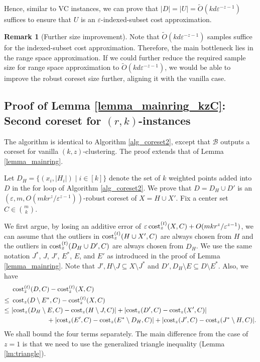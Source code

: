 \documentclass[11pt,letterpaper]{article}
\theoremstyle{definition}
\newtheorem{remark}[theorem]{Remark}
\newcommand{\eps}{\varepsilon}
\DeclarePairedDelimiter{\abs}{\lvert}{\rvert}
\begin{document}
Hence, similar to VC instances, we can prove that $|D| = |U| = \tilde{O}( k d \eps^{-z-1})$ suffices to ensure that $U$ is an $\eps$-indexed-subset cost approximation.
%

\begin{remark}[Further size improvement]
\label{remark:open}
Note that \( \tilde{O}( k d \eps^{-z-1}) \) samples suffice for the indexed-subset cost approximation.  
%
Therefore, the main bottleneck lies in the range space approximation.  
%
If we could further reduce the required sample size for range space approximation to \( \tilde{O}( k d \eps^{-z-1}) \), we would be able to improve the robust coreset size further, aligning it with the vanilla case.
\end{remark}

\subsection{Proof of Lemma \ref{lemma_mainring_kzC}: Second coreset for $(r,k)$-instances}
\label{sec:proof_2}

The algorithm is identical to Algorithm \ref{alg_coreset2}, except that \(\mathcal{B}\) outputs a coreset for vanilla \((k,z)\)-clustering.  
%
The proof extends that of Lemma \ref{lemma_mainring}.  
%


Let $D_H=\{(x_i,|H_i|)\mid i\in [k]\}$ denote the set of $k$ weighted points added into $D$ in the for loop of Algorithm \ref{alg_coreset2}. 
%
We prove that $D=D_H\cup D'$ is an $(\eps,m,O(mkr^z/\eps^{z-1}))$-robust coreset of $X=H\cup X'$.
%
Fix a center set $C\in \binom{m}{k}$.

We first argue, by losing an additive error of $\eps \cost_z^{(t)}(X, C) + O(mkr^z/\eps^{z-1})$, we can assume that the outliers in $\cost[t]_z(H\cup X', C)$ are always chosen from $H$ and the outliers in $\cost[t]_z(D_H\cup D', C)$ are always chosen from $D_H$. 
%
We use the same notation \( J^\ast \), \( J \), \( J' \), \( E^\ast \), \( E \), and \( E' \) as introduced in the proof of Lemma \ref{lemma_mainring}.
%
Note that $J', H\setminus J \subseteq X\setminus J^\ast$ and $D', D_H\setminus E \subseteq D\setminus E^\ast$.
%
Also, we have
	\begin{align*}
		& \ \cost[t]_z(D,C) - \cost[t]_z(X,C) \\
        \leq & \ \cost_z(D\setminus E^\ast,C) - \cost[t]_z(X,C)\\
        \leq & \ \abs{\cost_z(D_H\setminus E, C) - \cost_z(H\setminus J,C)} + \abs{\cost_z(D', C) - \cost_z(X',C)} \\
        &\hspace{2cm} + \abs{ \cost_z(E',C) - \cost_z(E^\ast\setminus D_H,C) } +\abs{ \cost_z(J',C) - \cost_z(J^\ast\setminus H,C) }.
	\end{align*}
We shall bound the four terms separately.
%
The main difference from the case of $z = 1$ is that we need to use the generalized triangle inequality (Lemma \ref{lm:triangle}).
\end{document}
